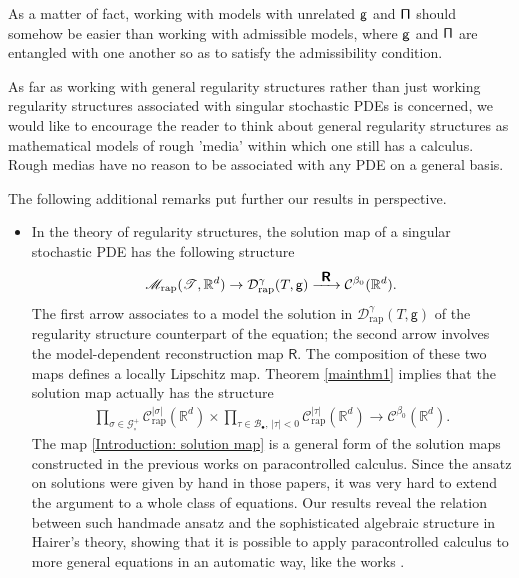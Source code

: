 \documentclass[11pt]{article}
\numberwithin{equation}{section}
\newcommand{\To}[1]{\mathchoice{\xrightarrow{\textstyle\kern4pt#1\kern3pt}}{\stackrel{#1}{\longrightarrow}}{}{}}
\newcommand{\sbullet}{{\scriptscriptstyle\bullet}}
\theoremstyle{plain}
\theoremstyle{definition}
\newcommand{\rap}{\mathrm{rap}}
\newcommand{\reR}{\boldsymbol{\mathsf{R}}}
\newcommand{\sfg}{\mathsf{g}}
\newcommand{\scrM}{\mathscr{M}}
\newcommand{\scrT}{\mathscr{T}}
\newcommand{\bbR}{\mathbb{R}}
\newcommand{\mcB}{\mathcal{B}}
\newcommand{\mcC}{\mathcal{C}}
\newcommand{\mcD}{\mathcal{D}}
\newcommand{\mcG}{\mathcal{G}}
\begin{document}
As a matter of fact, working with models with unrelated $\sf g$ and $\sf \Pi$ should somehow be easier than working with admissible models, where $\sf g$ and $\sf \Pi$ are entangled with one another so as to satisfy the admissibility condition.

As far as working with general regularity structures rather than just working regularity structures associated with singular stochastic PDEs is concerned, we would like to encourage the reader to think about general regularity structures as mathematical models of rough 'media' within which one still has a calculus. Rough medias have no reason to be associated with any PDE on a general basis.

The following additional remarks put further our results in perspective.
\begin{itemize}
	\item In the theory of regularity structures, the solution map of a singular stochastic PDE has the following structure
\[
\scrM_\rap(\scrT,\bbR^d) \to \mcD_\rap^\gamma(T,\sfg) \To{\reR} \mcC^{\beta_0}(\bbR^d).
\]
The first arrow associates to a model the solution in $\mcD_\rap^\gamma(T,\sfg)$ of the regularity structure counterpart of the equation; the second arrow involves the model-dependent reconstruction map $\reR$. The composition of these two maps defines a locally Lipschitz map. Theorem \ref{mainthm1} implies that the solution map actually has the structure
\begin{align}\label{Introduction: solution map}
\prod_{\sigma\in\mcG_\circ^+} \mcC_\rap^{|\sigma|}(\bbR^d) \times \prod_{\tau\in\mcB_\sbullet,\,|\tau|<0} \mcC_\rap^{|\tau|}(\bbR^d)
\to \mcC^{\beta_0}(\bbR^d).
\end{align}
The map \eqref{Introduction: solution map} is a general form of the solution maps constructed in the previous works \cite{GIP, BB16} on paracontrolled calculus. Since the ansatz on solutions were given by hand in those papers, it was very hard to extend the argument to a whole class of equations. Our results reveal the relation between such handmade ansatz and the sophisticated algebraic structure in Hairer's theory, showing that it is possible to apply paracontrolled calculus to more general equations in an automatic way, like the works \cite{Hai, BHZ, CH16, BCCH18}.
	

\end{itemize}
\end{document}
